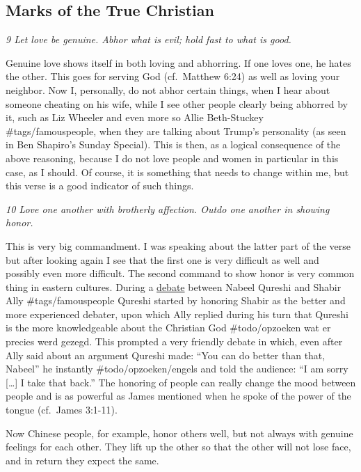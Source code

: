 \subsection{Marks of the True Christian} \emph{9 Let love be genuine. Abhor
what is evil; hold fast to what is good.}

Genuine love shows itself in both loving and abhorring. If one loves
one, he hates the other. This goes for serving God (cf.~Matthew 6:24) as
well as loving your neighbor. Now I, personally, do not abhor certain
things, when I hear about someone cheating on his wife, while I see
other people clearly being abhorred by it, such as Liz Wheeler and even
more so Allie Beth-Stuckey \#tags/famouspeople, when they are talking
about Trump's personality (as seen in Ben Shapiro's Sunday Special).
This is then, as a logical consequence of the above reasoning, because I
do not love people and women in particular in this case, as I should. Of
course, it is something that needs to change within me, but this verse
is a good indicator of such things.

\emph{10 Love one another with brotherly affection. Outdo one another
in showing honor.}

This is very big commandment. I was speaking about the latter part of
the verse but after looking again I see that the first one is very
difficult as well and possibly even more difficult. The second command
to show honor is very common thing in eastern cultures. During a
\href{https://www.rzim.org/read/rzim-global/nabeel-qureshi-debates-muslim-apologist-shabir-ally}{debate}
between Nabeel Qureshi and Shabir Ally \#tags/famouspeople Qureshi
started by honoring Shabir as the better and more experienced debater,
upon which Ally replied during his turn that Qureshi is the more
knowledgeable about the Christian God \#todo/opzoeken wat er precies
werd gezegd. This prompted a very friendly debate in which, even after
Ally said about an argument Qureshi made: ``You can do better than that,
Nabeel'' he instantly \#todo/opzoeken/engels and told the audience: ``I
am sorry {[}\ldots{]} I take that back.'' The honoring of people can
really change the mood between people and is as powerful as James
mentioned when he spoke of the power of the tongue (cf.~James 3:1-11).

Now Chinese people, for example, honor others well, but not always with
genuine feelings for each other. They lift up the other so that the
other will not lose face, and in return they expect the same.

